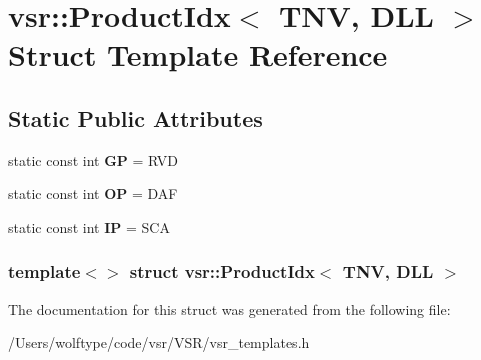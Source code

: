 \hypertarget{structvsr_1_1_product_idx_3_01_t_n_v_00_01_d_l_l_01_4}{\section{vsr\-:\-:Product\-Idx$<$ T\-N\-V, D\-L\-L $>$ Struct Template Reference}
\label{structvsr_1_1_product_idx_3_01_t_n_v_00_01_d_l_l_01_4}
}
\subsection*{Static Public Attributes}
\begin{DoxyCompactItemize}
\item 
\hypertarget{structvsr_1_1_product_idx_3_01_t_n_v_00_01_d_l_l_01_4_a2680eeea4c7d3e5378476399017ae374}{static const int {\bfseries G\-P} = R\-V\-D}\label{structvsr_1_1_product_idx_3_01_t_n_v_00_01_d_l_l_01_4_a2680eeea4c7d3e5378476399017ae374}

\item 
\hypertarget{structvsr_1_1_product_idx_3_01_t_n_v_00_01_d_l_l_01_4_a57cde1cc5e6e5221158c4a378af4730f}{static const int {\bfseries O\-P} = D\-A\-F}\label{structvsr_1_1_product_idx_3_01_t_n_v_00_01_d_l_l_01_4_a57cde1cc5e6e5221158c4a378af4730f}

\item 
\hypertarget{structvsr_1_1_product_idx_3_01_t_n_v_00_01_d_l_l_01_4_a93e11f1dfc9059111969a956065b13c9}{static const int {\bfseries I\-P} = S\-C\-A}\label{structvsr_1_1_product_idx_3_01_t_n_v_00_01_d_l_l_01_4_a93e11f1dfc9059111969a956065b13c9}

\end{DoxyCompactItemize}
\subsubsection*{template$<$$>$ struct vsr\-::\-Product\-Idx$<$ T\-N\-V, D\-L\-L $>$}



The documentation for this struct was generated from the following file\-:\begin{DoxyCompactItemize}
\item 
/\-Users/wolftype/code/vsr/\-V\-S\-R/vsr\-\_\-templates.\-h\end{DoxyCompactItemize}
